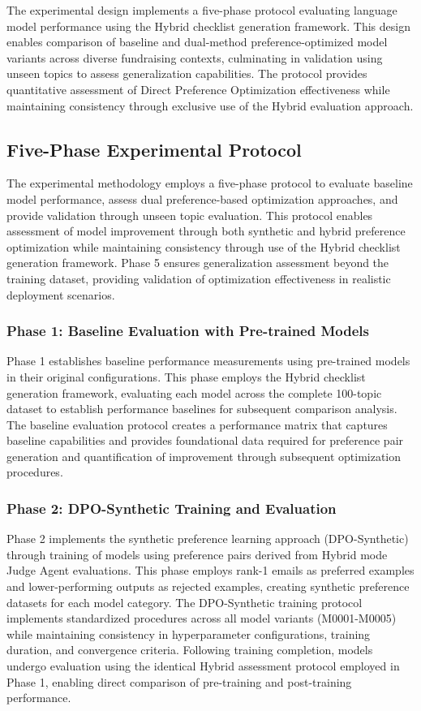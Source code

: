 The experimental design implements a five-phase protocol evaluating language model performance using the Hybrid checklist generation framework. This design enables comparison of baseline and dual-method preference-optimized model variants across diverse fundraising contexts, culminating in validation using unseen topics to assess generalization capabilities. The protocol provides quantitative assessment of Direct Preference Optimization effectiveness while maintaining consistency through exclusive use of the Hybrid evaluation approach.

\subsection{Five-Phase Experimental Protocol}

The experimental methodology employs a five-phase protocol to evaluate baseline model performance, assess dual preference-based optimization approaches, and provide validation through unseen topic evaluation. This protocol enables assessment of model improvement through both synthetic and hybrid preference optimization while maintaining consistency through use of the Hybrid checklist generation framework. Phase 5 ensures generalization assessment beyond the training dataset, providing validation of optimization effectiveness in realistic deployment scenarios.

\subsubsection{Phase 1: Baseline Evaluation with Pre-trained Models}

Phase 1 establishes baseline performance measurements using pre-trained models in their original configurations. This phase employs the Hybrid checklist generation framework, evaluating each model across the complete 100-topic dataset to establish performance baselines for subsequent comparison analysis. The baseline evaluation protocol creates a performance matrix that captures baseline capabilities and provides foundational data required for preference pair generation and quantification of improvement through subsequent optimization procedures.

\subsubsection{Phase 2: DPO-Synthetic Training and Evaluation}

Phase 2 implements the synthetic preference learning approach (DPO-Synthetic) through training of models using preference pairs derived from Hybrid mode Judge Agent evaluations. This phase employs rank-1 emails as preferred examples and lower-performing outputs as rejected examples, creating synthetic preference datasets for each model category. The DPO-Synthetic training protocol implements standardized procedures across all model variants (M0001-M0005) while maintaining consistency in hyperparameter configurations, training duration, and convergence criteria. Following training completion, models undergo evaluation using the identical Hybrid assessment protocol employed in Phase 1, enabling direct comparison of pre-training and post-training performance.

